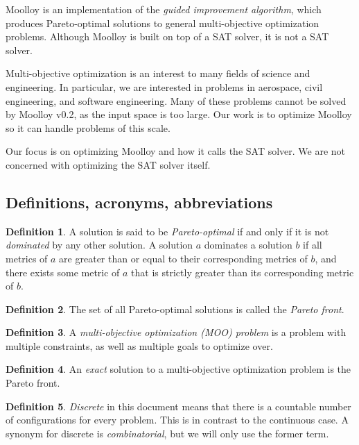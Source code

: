 \documentclass[11pt]{article}
\theoremstyle{definition}
\newtheorem{mydef}{Definition}
\begin{document}
Moolloy is an implementation of the \textit{guided improvement
algorithm}, which produces Pareto-optimal solutions to general
multi-objective optimization problems. Although Moolloy is built on top
of a SAT solver, it is not a SAT solver.

Multi-objective optimization is an interest to many fields of science
and engineering. In particular, we are interested in problems in
aerospace, civil engineering, and software engineering. Many of these
problems cannot be solved by Moolloy v0.2, as the input space is too
large. Our work is to optimize Moolloy so it can handle problems of
this scale.

Our focus is on optimizing Moolloy and how it calls the SAT solver. We
are not concerned with optimizing the SAT solver itself.

\subsection{Definitions, acronyms, abbreviations}\label{sec:def}

\begin{mydef}
A solution is said to be \textit{Pareto-optimal} if and only if it is
not \textit{dominated} by any other solution. A solution $a$ dominates
a solution $b$ if all metrics of $a$ are greater than or equal to their
corresponding metrics of $b$, and there exists some metric of $a$ that
is strictly greater than its corresponding metric of $b$.
\end{mydef}

\begin{mydef}
The set of all Pareto-optimal solutions is called the
\textit{Pareto front}.
\end{mydef}

\begin{mydef}
A \textit{multi-objective optimization (MOO) problem} is a problem with
multiple constraints, as well as multiple goals to optimize over.
\end{mydef}

\begin{mydef}
An \textit{exact} solution to a multi-objective optimization problem is
the Pareto front.
\end{mydef}

\begin{mydef}
\textit{Discrete} in this document means that there is a countable
number of configurations for every problem. This is in contrast to the
continuous case. A synonym for discrete is \textit{combinatorial}, but
we will only use the former term.  \end{mydef}
\end{document}
